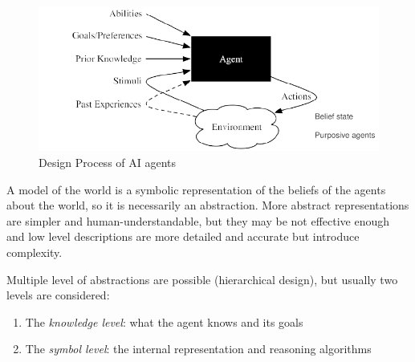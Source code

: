 \begin{figure}
    \caption{Design Process of AI agents}
    \label{img:designProcess}
    \includegraphics[width=\textwidth]{Images/agents}
\end{figure}
A model of the world is a symbolic representation of the beliefs of the agents about the world, 
so it is necessarily an abstraction.\newline
More abstract representations are simpler and human-understandable, but they
may be not effective enough and low level descriptions are more detailed and accurate but introduce complexity.

Multiple level of abstractions are possible (hierarchical design), but usually two levels are considered:
\begin{enumerate}
    \item The \emph{knowledge level}: what the agent knows and its goals
    \item The \emph{symbol level}: the internal representation and reasoning algorithms
\end{enumerate}

